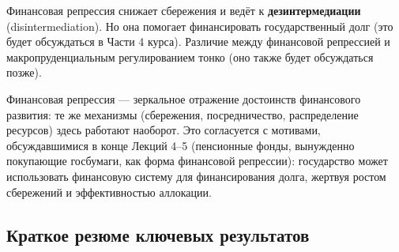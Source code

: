 \documentclass[10pt,a4paper]{article}
\begin{document}
Финансовая репрессия снижает сбережения и ведёт к \textbf{дезинтермедиации} (disintermediation). Но она помогает финансировать государственный долг (это будет обсуждаться в Части 4 курса). Различие между финансовой репрессией и макропруденциальным регулированием тонко (оно также будет обсуждаться позже).

\begin{intuition}
Финансовая репрессия — зеркальное отражение достоинств финансового развития: те же механизмы (сбережения, посредничество, распределение ресурсов) здесь работают наоборот. Это согласуется с мотивами, обсуждавшимися в конце Лекций 4--5 (пенсионные фонды, вынужденно покупающие госбумаги, как форма финансовой репрессии): государство может использовать финансовую систему для финансирования долга, жертвуя ростом сбережений и эффективностью аллокации.
\end{intuition}

\subsection{Краткое резюме ключевых результатов}
\end{document}
